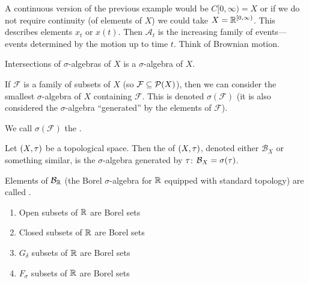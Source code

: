 \begin{example}
A continuous version of the previous example would be $C[0,\infty)=X$
or if we do not require continuity (of elements of $X$) we could take $X=\mathbb{R}^{[0,\infty)}$.
This describes elements $x_{t}$ or $x(t)$. Then $\mathcal{A}_{t}$ is
the increasing family of events---events determined by the motion up
to time $t$. Think of Brownian motion.
\end{example}

\begin{lemma}
Intersections of $\sigma$-algebras of $X$ is a $\sigma$-algebra of $X$.
\end{lemma}

\begin{lemma}
If $\mathcal{F}$ is a family of subsets of $X$ (so
$\mathcal{F}\subseteq\mathcal{P}(X)$), then we can consider the smallest
$\sigma$-algebra of $X$ containing $\mathcal{F}$. This is denoted
$\sigma(\mathcal{F})$ (it is also considered the $\sigma$-algebra
``generated'' by the elements of $\mathcal{F}$).
\end{lemma}

\begin{definition}
We call $\sigma(\mathcal{F})$ the .
\end{definition}

\begin{definition}
Let $(X,\tau)$ be a topological space. Then the 
of $(X,\tau)$, denoted either $\mathcal{B}_{X}$ or something similar, is the $\sigma$-algebra generated by $\tau$:
$\mathcal{B}_{X}=\sigma(\tau)$.
\end{definition}

\begin{definition}
Elements of $\mathcal{B}_{\mathbb{R}}$ (the Borel $\sigma$-algebra for $\mathbb{R}$
equipped with standard topology) are called .
\end{definition}

\begin{example}
\begin{enumerate}
\item Open subsets of $\mathbb{R}$ are Borel sets
\item Closed subsets of $\mathbb{R}$ are Borel sets
\item $G_{\delta}$ subsets of $\mathbb{R}$ are Borel sets
\item $F_{\sigma}$ subsets of $\mathbb{R}$ are Borel sets
\end{enumerate}
\end{example}

